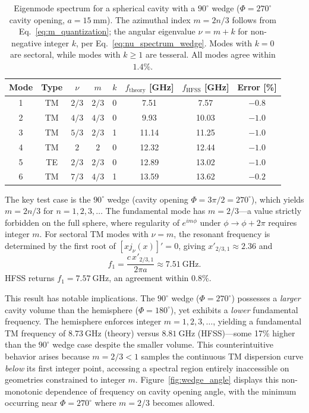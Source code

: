 \documentclass[
  aip,
  amsmath,amssymb,
  preprint
]{revtex4-1}
\begin{document}
\begin{table}[htbp]
\centering
\caption{Eigenmode spectrum for a spherical cavity with a $90^\circ$ wedge
($\Phi = 270^\circ$ cavity opening, $a = 15~\mathrm{mm}$).
The azimuthal index $m = 2n/3$ follows from Eq.~\eqref{eq:m_quantization};
the angular eigenvalue $\nu = m + k$ for non-negative integer $k$,
per Eq.~\eqref{eq:nu_spectrum_wedge}.
Modes with $k = 0$ are sectoral, while modes with $k \geq 1$ are tesseral.
All modes agree within $1.4\%$.}
\label{tab:wedge_spectrum}

\begin{tabular}{cccccccc}
\toprule
Mode & Type & $\nu$ & $m$ & $k$ &
$f_{\mathrm{theory}}$ [GHz] &
$f_{\mathrm{HFSS}}$ [GHz] &
Error [\%] \\
\midrule
1 & TM & $2/3$ & $2/3$ & 0 & 7.51 & 7.57 & $-0.8$ \\
2 & TM & $4/3$ & $4/3$ & 0 & 9.93 & 10.03 & $-1.0$ \\
3 & TM & $5/3$ & $2/3$ & 1 & 11.14 & 11.25 & $-1.0$ \\
4 & TM & $2$   & $2$   & 0 & 12.32 & 12.44 & $-1.0$ \\
5 & TE & $2/3$ & $2/3$ & 0 & 12.89 & 13.02 & $-1.0$ \\
6 & TM & $7/3$ & $4/3$ & 1 & 13.59 & 13.62 & $-0.2$ \\
\bottomrule
\end{tabular}
\end{table}

The key test case is the $90^\circ$ wedge (cavity opening $\Phi = 3\pi/2 = 270^\circ$), which yields $m = 2n/3$ for $n = 1, 2, 3, \ldots$ The fundamental mode has $m = 2/3$---a value strictly forbidden on the full sphere, where regularity of $e^{im\phi}$ under $\phi \to \phi + 2\pi$ requires integer $m$. For sectoral TM modes with $\nu = m$, the resonant frequency is determined by the first root of $[x j_\nu(x)]' = 0$, giving $x'_{2/3,1} \approx 2.36$ and
\begin{equation}
f_1 = \frac{c \, x'_{2/3,1}}{2\pi a} \approx 7.51~\mathrm{GHz}.
\end{equation}
HFSS returns $f_1 = 7.57~\mathrm{GHz}$, an agreement within $0.8\%$.

This result has notable implications. The $90^\circ$ wedge ($\Phi = 270^\circ$) possesses a \emph{larger} cavity volume than the hemisphere ($\Phi = 180^\circ$), yet exhibits a \emph{lower} fundamental frequency. The hemisphere enforces integer $m = 1, 2, 3, \ldots$, yielding a fundamental TM frequency of $8.73~\mathrm{GHz}$ (theory) versus $8.81~\mathrm{GHz}$ (HFSS)---some 17\% higher than the $90^\circ$ wedge case despite the smaller volume. This counterintuitive behavior arises because $m = 2/3 < 1$ samples the continuous TM dispersion curve \emph{below} its first integer point, accessing a spectral region entirely inaccessible on geometries constrained to integer $m$. Figure~\ref{fig:wedge_angle} displays this non-monotonic dependence of frequency on cavity opening angle, with the minimum occurring near $\Phi = 270^\circ$ where $m = 2/3$ becomes allowed.
\end{document}
